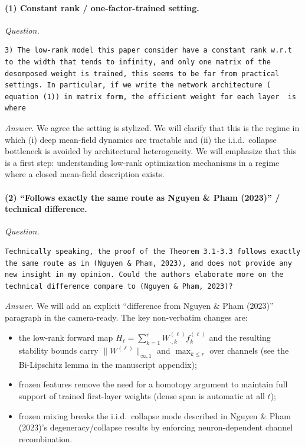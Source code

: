 \documentclass[11pt,a4paper]{article}
\newcommand{\NP}{Nguyen \& Pham (2023)}
\begin{document}
\paragraph{(1) Constant rank / one-factor-trained setting.}
\textit{Question.}\par
\begin{verbatim}
3) The low-rank model this paper consider have a constant rank w.r.t to the width that tends to infinity, and only one matrix of the desomposed weight is trained, this seems to be far from practical settings. In particular, if we write the network architecture ( equation (1)) in matrix form, the efficient weight for each layer  is  where
\end{verbatim}
\textit{Answer.} We agree the setting is stylized. We will clarify that this is the regime in which (i) deep mean-field dynamics are tractable and (ii) the i.i.d.\ collapse bottleneck is avoided by architectural heterogeneity. We will emphasize that this is a first step: understanding low-rank optimization mechanisms in a regime where a closed mean-field description exists.

\paragraph{(2) ``Follows exactly the same route as \NP{}'' / technical difference.}
\textit{Question.}\par
\begin{verbatim}
Technically speaking, the proof of the Theorem 3.1-3.3 follows exactly the same route as in (Nguyen & Pham, 2023), and does not provide any new insight in my opinion. Could the authors elaborate more on the technical difference compare to (Nguyen & Pham, 2023)?
\end{verbatim}
\textit{Answer.} We will add an explicit ``difference from \NP{}'' paragraph in the camera-ready. The key non-verbatim changes are:
\begin{itemize}
  \item the low-rank forward map $H_\ell=\sum_{k=1}^r W^{(\ell)}_{\cdot,k}f_k^{(\ell)}$ and the resulting stability bounds carry $\|W^{(\ell)}\|_{\infty,1}$ and $\max_{k\le r}$ over channels (see the Bi-Lipschitz lemma in the manuscript appendix);
  \item frozen features remove the need for a homotopy argument to maintain full support of trained first-layer weights (dense span is automatic at all $t$);
  \item frozen mixing breaks the i.i.d.\ collapse mode described in \NP{}'s degeneracy/collapse results by enforcing neuron-dependent channel recombination.
\end{itemize}
\end{document}
